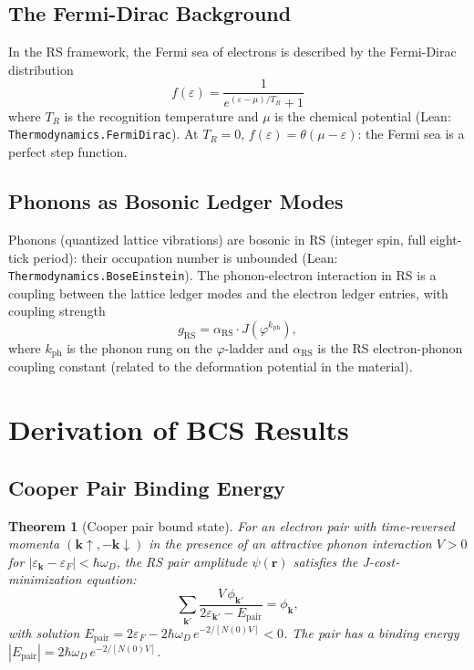 \documentclass[12pt,a4paper]{article}
\newtheorem{theorem}{Theorem}[section]
\theoremstyle{definition}
\theoremstyle{remark}
\begin{document}
\subsection{The Fermi-Dirac Background}

In the RS framework, the Fermi sea of electrons is described by the
Fermi-Dirac distribution
\begin{equation}
  f(\varepsilon) = \frac{1}{e^{(\varepsilon - \mu)/T_R} + 1}
\end{equation}
where $T_R$ is the recognition temperature and $\mu$ is the chemical
potential (Lean: \texttt{Thermodynamics.FermiDirac}).  At $T_R = 0$,
$f(\varepsilon) = \theta(\mu - \varepsilon)$: the Fermi sea is a
perfect step function.

\subsection{Phonons as Bosonic Ledger Modes}

Phonons (quantized lattice vibrations) are bosonic in RS (integer spin,
full eight-tick period): their occupation number is unbounded
(Lean: \texttt{Thermodynamics.BoseEinstein}).  The phonon-electron
interaction in RS is a coupling between the lattice ledger modes and the
electron ledger entries, with coupling strength
\begin{equation}
  g_\mathrm{RS} = \alpha_\mathrm{RS} \cdot J\!\left(\varphi^{k_\mathrm{ph}}\right),
\end{equation}
where $k_\mathrm{ph}$ is the phonon rung on the $\varphi$-ladder and
$\alpha_\mathrm{RS}$ is the RS electron-phonon coupling constant
(related to the deformation potential in the material).

\section{Derivation of BCS Results}
\label{sec:derivation}

\subsection{Cooper Pair Binding Energy}

\begin{theorem}[Cooper pair bound state]\label{thm:cooper}
For an electron pair with time-reversed momenta $(\mathbf{k}\uparrow,
-\mathbf{k}\downarrow)$ in the presence of an attractive phonon
interaction $V > 0$ for $|\varepsilon_\mathbf{k} - \varepsilon_F| <
\hbar\omega_D$, the RS pair amplitude $\psi(\mathbf{r})$ satisfies
the J-cost-minimization equation:
\begin{equation}
  \sum_{\mathbf{k}'}
  \frac{V\,\phi_{\mathbf{k}'}}{2\varepsilon_{\mathbf{k}'} - E_\mathrm{pair}}
  = \phi_\mathbf{k},
\end{equation}
with solution $E_\mathrm{pair} = 2\varepsilon_F - 2\hbar\omega_D\,
e^{-2/[N(0)V]} < 0$.  The pair has a binding energy
$|E_\mathrm{pair}| = 2\hbar\omega_D\,e^{-2/[N(0)V]}$.
\end{theorem}
\end{document}
